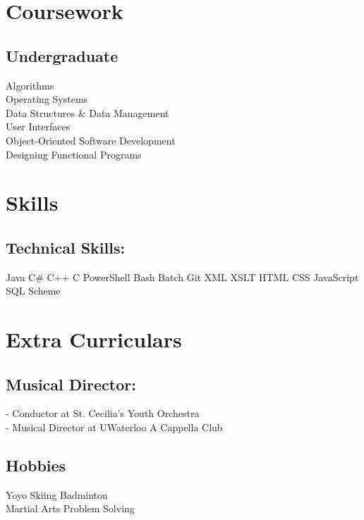 \documentclass[letterpaper]{kevin-resume} %
\begin{document}
\begin{minipage}[t]{0.30\textwidth}
\section{Coursework}

\subsection{Undergraduate}

Algorithms \\
Operating Systems \\
Data Structures \& Data Management \\
User Interfaces \\
Object-Oriented Software Development \\
Designing Functional Programs \\

\sectionspace %


\section{Skills}

\subsection{Technical Skills:}
Java \textbullet{}
C\# \textbullet{} 
C++ \textbullet{} 
C \textbullet{}
PowerShell
Bash \textbullet{} 
Batch \textbullet{} 
Git \textbullet{} 
XML \textbullet{} 
XSLT
HTML \textbullet{} 
CSS \textbullet{} 
JavaScript \textbullet{} 
SQL
Scheme

\sectionspace %

\section{Extra Curriculars}
\subsection{Musical Director:}
 - Conductor at St. Cecilia’s Youth Orchestra \\
 - Musical Director at UWaterloo A Cappella Club
\sectionspace %
\subsection{Hobbies}
Yoyo \textbullet{} 
Skiing \textbullet{} 
Badminton \\
Martial Arts \textbullet{} 
Problem Solving


\end{minipage} %
\end{document}
